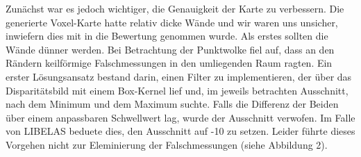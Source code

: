 \documentclass[12pt,titlepage, a4paper]{article}
\begin{document}
Zunächst war es jedoch wichtiger, die Genauigkeit der Karte zu verbessern. Die generierte Voxel-Karte hatte relativ dicke Wände und wir waren uns unsicher, inwiefern dies mit in die Bewertung genommen wurde. Als erstes sollten die Wände dünner werden. Bei Betrachtung der Punktwolke fiel auf, dass an den Rändern keilförmige Falschmessungen in den umliegenden Raum ragten. Ein erster Lösungsansatz bestand darin, einen Filter zu implementieren, der über das Disparitätsbild mit einem Box-Kernel lief und, im jeweils betrachten Ausschnitt, nach dem Minimum und dem Maximum suchte. Falls die Differenz der Beiden über einem anpassbaren Schwellwert lag, wurde der Ausschnitt verwofen. Im Falle von LIBELAS beduete dies, den Ausschnitt auf -10 zu setzen. Leider führte dieses Vorgehen nicht zur Eleminierung der Falschmessungen (siehe Abbildung 2).
\end{document}
